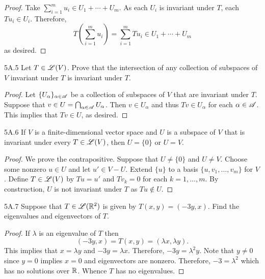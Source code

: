 \documentclass[../AlgebraQualSolutions.tex]{subfiles}
\begin{document}
\begin{proof}
Take $\sum_{i=1}^m u_i \in U_1 + \cdots + U_m$. As each $U_i$ is invariant under $T$, each $Tu_i \in U_i$. Therefore,
	\[T\left(\sum_{i=1}^m u_i\right) = \sum_{i=1}^m Tu_i \in U_1 + \cdots + U_m \]
as desired.
\end{proof}

\begin{LA}{5A.5}{}
Let $T \in \mathscr{L}(V)$. Prove that the intersection of any collection of subspaces of $V$ invariant under $T$ is invariant under $T$.
\end{LA}

\begin{proof}
Let $\{U_\alpha\}_{\alpha \in \mathscr{A}}$ be a collection of subspaces of $V$ that are invariant under $T$. Suppose that $v \in U = \bigcap_{\alpha \in \mathscr{A}} U_\alpha$. Then $v \in U_\alpha$ and thus $Tv \in U_\alpha$ for each $\alpha \in \mathscr{A}$. This implies that $Tv \in U$, as desired.
\end{proof}

\begin{LA}{5A.6}{}
If $V$ is a finite-dimensional vector space and $U$ is a subspace of $V$ that is invariant under every $T \in \mathscr{L}(V)$, then $U = \{0\}$ or $U = V$.
\end{LA}

\begin{proof}
We prove the contrapositive. Suppose that $U \neq \{0\}$ and $U \neq V$. Choose some nonzero $u \in U$ and let $u' \in V - U$. Extend $\{u\}$ to a basis $\{u, v_1, \ldots, v_m \}$ for $V$. Define $T \in \mathscr{L}(V)$ by $Tu = u'$ and $Tv_k = 0$ for each $k = 1, \ldots, m$. By construction, $U$ is not invariant under $T$ as $Tu \not\in U$.
\end{proof}

\begin{LA}{5A.7}{}
Suppose that $T \in \mathscr{L}(\mathbb{R}^2)$ is given by $T(x,y) = (-3y, x)$. Find the eigenvalues  and eigenvectors of $T$.
\end{LA}

\begin{proof}
If $\lambda$ is an eigenvalue of $T$ then
	\[(-3y, x) = T(x,y) = (\lambda x, \lambda y). \]
This implies that $x = \lambda y$ and $-3y = \lambda x$. Therefore, $-3y = \lambda^2 y$. Note that $y\neq 0$ since $y = 0$ implies $x = 0$ and eigenvectors are nonzero. Therefore, $-3 = \lambda^2$ which has no solutions over $\mathbb{R}$. Whence $T$ has no eigenvalues.
\end{proof}
\end{document}
